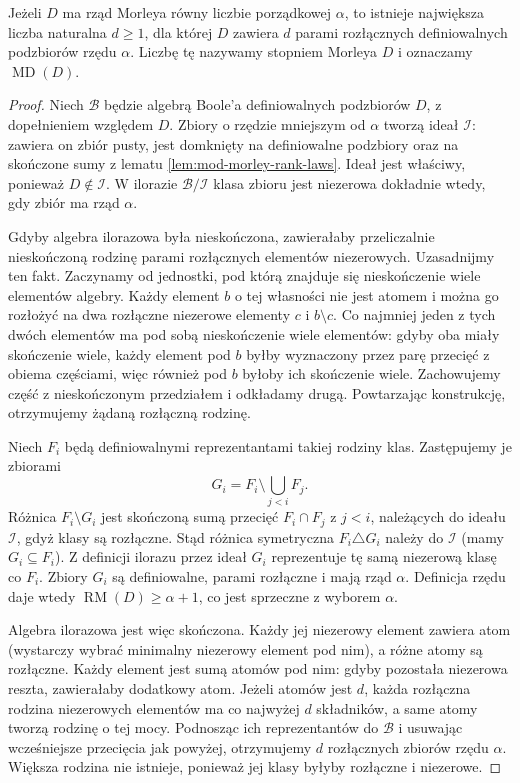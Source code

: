 \begin{twierdzenie}
\label{thm:mod-morley-degree}
Jeżeli $D$ ma rząd Morleya równy liczbie
porządkowej $\alpha$, to istnieje największa
liczba naturalna $d\geq1$, dla której $D$
zawiera $d$ parami rozłącznych definiowalnych
podzbiorów rzędu $\alpha$.
Liczbę tę nazywamy stopniem Morleya $D$
i oznaczamy $\operatorname{MD}(D)$.
\end{twierdzenie}
\begin{proof}
Niech $\mathcal B$ będzie algebrą Boole'a
definiowalnych podzbiorów $D$,
z dopełnieniem względem $D$.
Zbiory o rzędzie mniejszym od $\alpha$
tworzą ideał $\mathcal I$: zawiera on
zbiór pusty, jest domknięty na definiowalne
podzbiory oraz na skończone sumy z lematu
\ref{lem:mod-morley-rank-laws}.
Ideał jest właściwy, ponieważ $D\notin\mathcal I$.
W ilorazie $\mathcal B/\mathcal I$ klasa
zbioru jest niezerowa dokładnie wtedy,
gdy zbiór ma rząd $\alpha$.

Gdyby algebra ilorazowa była nieskończona,
zawierałaby przeliczalnie nieskończoną
rodzinę parami rozłącznych elementów niezerowych.
Uzasadnijmy ten fakt. Zaczynamy od jednostki,
pod którą znajduje się nieskończenie wiele
elementów algebry. Każdy element $b$ o tej
własności nie jest atomem i można go
rozłożyć na dwa rozłączne niezerowe elementy
$c$ i $b\setminus c$.
Co najmniej jeden z tych dwóch elementów
ma pod sobą nieskończenie wiele elementów:
gdyby oba miały skończenie wiele,
każdy element pod $b$ byłby wyznaczony
przez parę przecięć z obiema częściami,
więc również pod $b$ byłoby ich skończenie wiele.
Zachowujemy część z nieskończonym przedziałem
i odkładamy drugą. Powtarzając konstrukcję,
otrzymujemy żądaną rozłączną rodzinę.

Niech $F_i$ będą definiowalnymi reprezentantami
takiej rodziny klas. Zastępujemy je zbiorami
\[
G_i=F_i\setminus\bigcup_{j<i}F_j.
\]
Różnica $F_i\setminus G_i$ jest skończoną sumą
przecięć $F_i\cap F_j$ z $j<i$, należących
do ideału $\mathcal I$, gdyż klasy są rozłączne.
Stąd różnica symetryczna $F_i\triangle G_i$
należy do $\mathcal I$ (mamy $G_i\subseteq F_i$).
Z definicji ilorazu przez ideał $G_i$ reprezentuje
tę samą niezerową klasę co $F_i$. Zbiory $G_i$ są definiowalne,
parami rozłączne i mają rząd $\alpha$.
Definicja rzędu daje wtedy
$\operatorname{RM}(D)\geq\alpha+1$,
co jest sprzeczne z wyborem $\alpha$.

Algebra ilorazowa jest więc skończona.
Każdy jej niezerowy element zawiera atom
(wystarczy wybrać minimalny niezerowy element
pod nim), a różne atomy są rozłączne.
Każdy element jest sumą atomów pod nim:
gdyby pozostała niezerowa reszta, zawierałaby
dodatkowy atom. Jeżeli atomów jest $d$,
każda rozłączna rodzina niezerowych elementów
ma co najwyżej $d$ składników, a same atomy
tworzą rodzinę o tej mocy.
Podnosząc ich reprezentantów do $\mathcal B$
i usuwając wcześniejsze przecięcia jak powyżej,
otrzymujemy $d$ rozłącznych zbiorów rzędu $\alpha$.
Większa rodzina nie istnieje, ponieważ jej
klasy byłyby rozłączne i niezerowe.
\end{proof}


